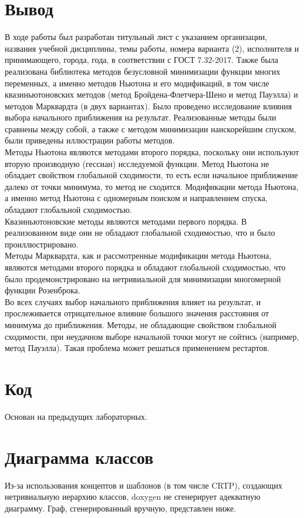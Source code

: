 \documentclass[russian, english]{article}
\begin{document}
\section{Вывод}
В ходе работы был разработан титульный лист с указанием организации, названия учебной дисциплины, темы работы, номера варианта (2), исполнителя и принимающего, города, года, в соответствии с ГОСТ 7.32-2017. Также была реализована библиотека методов безусловной минимизации функции многих переменных, а именно методов Ньютона и его модификаций, в том числе квазиньютоновских методов (метод Бройдена-Флетчера-Шено и метод Пауэлла) и методов Марквардта (в двух вариантах). Было проведено исследование влияния выбора начального приближения на результат. Реализованные методы были сравнены между собой, а также с методом минимизации наискорейшим спуском, были приведены иллюстрации работы методов.\\
Методы Ньютона являются методами второго порядка, поскольку они используют вторую производную (гессиан) исследуемой функции. Метод Ньютона не обладает свойством глобальной сходимости, то есть если начальное приближение далеко от точки минимума, то метод не сходится. Модификации метода Ньютона, а именно метод Ньютона с одномерным поиском и направлением спуска, обладают глобальной сходимостью.\\
Квазиньютоновские методы являются методами первого порядка. В реализованном виде они не обладают глобальной сходимостью, что и было проиллюстрировано.\\
Методы Марквардта, как и рассмотренные модификации метода Ньютона, являются методами второго порядка и обладают глобальной сходимостью, что было продемонстрировано на нетривиальной для минимизации многомерной функции Розенброка.\\
Во всех случаях выбор начального приближения влияет на результат, и прослеживается отрицательное влияние большого значения расстояния от минимума до приближения. Методы, не обладающие свойством глобальной сходимости, при неудачном выборе начальной точки могут не сойтись (например, метод Пауэлла). Такая проблема может решаться применением рестартов.

\newpage
\appendix
\section{Код}
Основан на предыдущих лабораторных.

\section{Диаграмма классов}
Из-за использования концептов и шаблонов (в том числе CRTP), создающих нетривиальную иерархию классов, doxygen не сгенерирует адекватную диаграмму. Граф, сгенерированный вручную, представлен ниже. \\
\noindent{}
%
\end{document}
